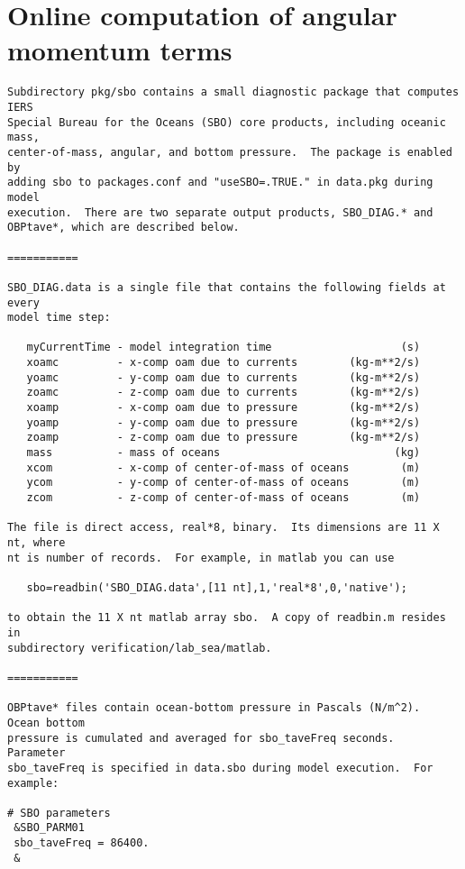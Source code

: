 
\chapter{Online computation of angular momentum terms}

\begin{verbatim}
Subdirectory pkg/sbo contains a small diagnostic package that computes IERS
Special Bureau for the Oceans (SBO) core products, including oceanic mass,
center-of-mass, angular, and bottom pressure.  The package is enabled by
adding sbo to packages.conf and "useSBO=.TRUE." in data.pkg during model
execution.  There are two separate output products, SBO_DIAG.* and
OBPtave*, which are described below.

===========

SBO_DIAG.data is a single file that contains the following fields at every
model time step:

   myCurrentTime - model integration time                    (s)
   xoamc         - x-comp oam due to currents        (kg-m**2/s)
   yoamc         - y-comp oam due to currents        (kg-m**2/s)
   zoamc         - z-comp oam due to currents        (kg-m**2/s)
   xoamp         - x-comp oam due to pressure        (kg-m**2/s)
   yoamp         - y-comp oam due to pressure        (kg-m**2/s)
   zoamp         - z-comp oam due to pressure        (kg-m**2/s)
   mass          - mass of oceans                           (kg)
   xcom          - x-comp of center-of-mass of oceans        (m)
   ycom          - y-comp of center-of-mass of oceans        (m)
   zcom          - z-comp of center-of-mass of oceans        (m)

The file is direct access, real*8, binary.  Its dimensions are 11 X nt, where
nt is number of records.  For example, in matlab you can use

   sbo=readbin('SBO_DIAG.data',[11 nt],1,'real*8',0,'native');

to obtain the 11 X nt matlab array sbo.  A copy of readbin.m resides in
subdirectory verification/lab_sea/matlab.

===========

OBPtave* files contain ocean-bottom pressure in Pascals (N/m^2).  Ocean bottom
pressure is cumulated and averaged for sbo_taveFreq seconds.  Parameter
sbo_taveFreq is specified in data.sbo during model execution.  For example:

# SBO parameters
 &SBO_PARM01
 sbo_taveFreq = 86400.
 &


\end{verbatim}
